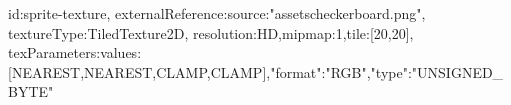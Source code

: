 {id:sprite-texture,
externalReference:{source:"assets\/checkerboard.png"},
textureType:TiledTexture2D,
resolution:HD,mipmap:1,tile:[20,20],
texParameters:{values:[NEAREST,NEAREST,CLAMP,CLAMP]},"format":"RGB","type":"UNSIGNED_BYTE"}